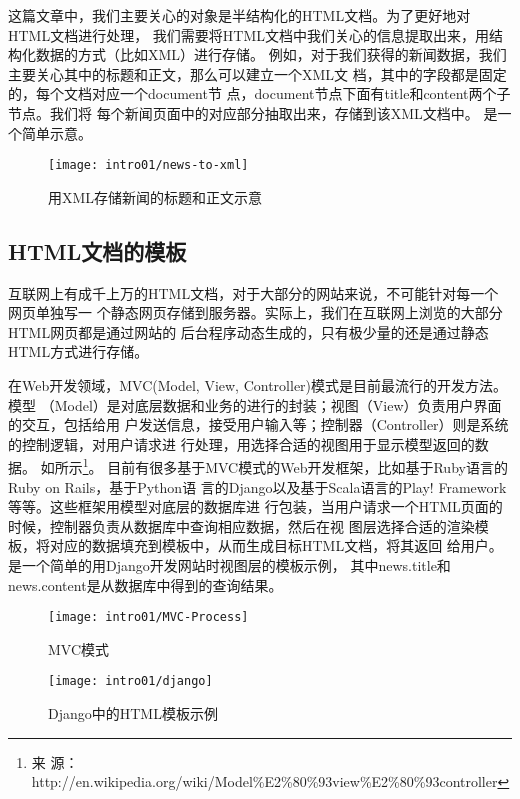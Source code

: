 这篇文章中，我们主要关心的对象是半结构化的HTML文档。为了更好地对HTML文档进行处理，
我们需要将HTML文档中我们关心的信息提取出来，用结构化数据的方式（比如XML）进行存储。
例如，对于我们获得的新闻数据，我们主要关心其中的标题和正文，那么可以建立一个XML文
档，其中的字段都是固定的，每个文档对应一个{document}节
点，{document}节点下面有{title}和{content}两个子节点。我们将
每个新闻页面中的对应部分抽取出来，存储到该XML文档中。
是一个简单示意。
\begin{figure}[h]
  \centering
  \texttt{[image: intro01/news-to-xml]}
  \caption{用XML存储新闻的标题和正文示意}
  \label{intro:fig:blog-to-xml}
\end{figure}

\subsection{HTML文档的模板}
\label{sec:htmltemplateintro}
互联网上有成千上万的HTML文档，对于大部分的网站来说，不可能针对每一个网页单独写一
个静态网页存储到服务器。实际上，我们在互联网上浏览的大部分HTML网页都是通过网站的
后台程序动态生成的，只有极少量的还是通过静态HTML方式进行存储。

在Web开发领域，MVC(Model, View, Controller)模式是目前最流行的开发方法。模型
（Model）是对底层数据和业务的进行的封装；视图（View）负责用户界面的交互，包括给用
户发送信息，接受用户输入等；控制器（Controller）则是系统的控制逻辑，对用户请求进
行处理，用选择合适的视图用于显示模型返回的数据。
如所示\footnote{来
  源：http://en.wikipedia.org/wiki/Model\%E2\%80\%93view\%E2\%80\%93controller}。
目前有很多基于MVC模式的Web开发框架，比如基于Ruby语言的Ruby on Rails，基于Python语
言的Django以及基于Scala语言的Play! Framework等等。这些框架用模型对底层的数据库进
行包装，当用户请求一个HTML页面的时候，控制器负责从数据库中查询相应数据，然后在视
图层选择合适的渲染模板，将对应的数据填充到模板中，从而生成目标HTML文档，将其返回
给用户。是一个简单的用Django开发网站时视图层的模板示例，
其中{news.title}和{news.content}是从数据库中得到的查询结果。
\begin{figure}
  \begin{minipage}[t]{0.5\linewidth}
  \centering
  \texttt{[image: intro01/MVC-Process]}
  \caption{MVC模式}
  \label{intro:fig:mvc}
  \end{minipage}
  \begin{minipage}[t]{0.5\linewidth}
  \centering
  \texttt{[image: intro01/django]}
  \caption{Django中的HTML模板示例}
  \label{intro:fig:django}
  \end{minipage}
\end{figure}

